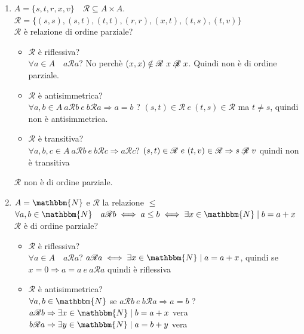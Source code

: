 \documentclass[12pt, letterpaper]{report}
\begin{document}
  		\begin{enumerate}
  			\item $A = \{s, t, r, x, v\} \quad \mathscr{R} \subseteq A \times A$. \\
  			$\mathscr{R} = \{(s,s), (s, t), (t, t), (r, r), (x, t), (t, s), (t, v)\}$ \\
  			$\mathscr{R}$ è relazione di ordine parziale?
  			\begin{itemize}
  				\item $\mathscr{R}$ è riflessiva?\\
  				$\forall a \in A \quad a\mathscr{R}a?$ No perchè $(x,x) \notin \mathscr{R}\ x\centernot{\mathscr{R}}x$. Quindi non è di ordine parziale.
  				\item $\mathscr{R}$ è antisimmetrica? \\
  				$\forall a, b \in A\ a\mathscr{R}b \ e \ b\mathscr{R}a \Rightarrow a = b$ ? $(s, t) \in \mathscr{R} \ e \ (t, s) \in \mathscr{R}$ ma $t \neq s$, quindi non è antisimmetrica.
  				\item $\mathscr{R}$ è transitiva?\\
  				 $\forall a,b,c \in A \ a \mathscr{R}b \ e \ b\mathscr{R}c \Rightarrow a\mathscr{R}c$? $(s, t) \in \mathscr{R} \ e \ (t, v) \in \mathscr{R} \Rightarrow s\centernot{\mathscr{R}}v$ quindi non è transitiva
  			\end{itemize}
  			$\mathscr{R}$ non è di ordine parziale.
  			\item $A = \mathbbm{N}$ e $\mathscr{R}$ la relazione $\leq$ \\
  			$\forall a,b \in \mathbbm{N} \quad a \mathscr{R}b \iff a \leq b \iff \exists x \in \mathbbm{N} \mid b = a + x$ \\
  			$\mathscr{R}$ è di ordine parziale?
  			\begin{itemize}
  				\item $\mathscr{R}$ è riflessiva? \\
  				$\forall a \in A \quad a \mathscr{R} a$? $a\mathscr{R}a \iff \exists x \in \mathbbm{N} \mid a = a + x$, quindi se $x = 0 \Rightarrow a=a \ e \ a\mathscr{R}a$ quindi è riflessiva
  				\item $\mathscr{R}$ è antisimmetrica? \\
  				 $\forall a,b \in \mathbbm{N}$ se $a\mathscr{R}b \ e \ b\mathscr{R}a \Rightarrow a=b$ ? \\
  				$a\mathscr{R}b \Rightarrow \exists x \in \mathbbm{N} \mid b = a + x$ vera \\
  				$b\mathscr{R}a \Rightarrow \exists y \in \mathbbm{N} \mid a = b + y$ vera \\

\end{itemize}
\end{enumerate}
\end{document}
